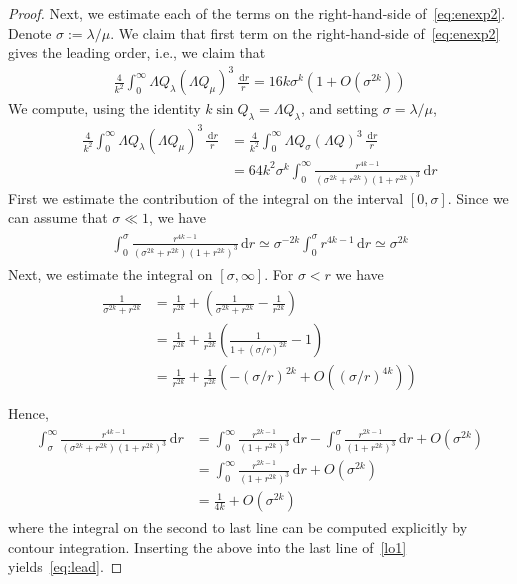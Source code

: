 \documentclass[10pt,reqno]{amsart}
\newcommand{\la}{\lambda}
\newcommand{\s}{\sigma}
\newcommand{\La}{\Lambda}
\newcommand{\I}{\infty}
\newcommand{\ant}[1]{\begin{align*}\begin{split} #1 \end{split}\end{align*}}
\newcommand{\EQ}[1]{\begin{equation}\begin{split} #1 \end{split}\end{equation}}
\numberwithin{equation}{section}
\theoremstyle{remark}
\newcommand{\dr}{\, \mathrm{d}r}
\newcommand{\0}{\emptyset}
\begin{document}
\begin{proof}
{ }
 Next, we estimate each of the terms on the right-hand-side of~\eqref{eq:enexp2}. Denote $\s := \la / \mu$. We claim that first term on the right-hand-side of~\eqref{eq:enexp2} gives the leading order, i.e., we claim that 
 \EQ{ \label{eq:lead}
  \frac{4}{k^2} \int_0^\I \La Q_\la (\La Q_\mu)^3 \, \frac{\dr}{r} = 16k \s^k( 1+ O(\s^{2k})) 
 } 
 We compute, using the identity $k \sin Q_\la =\La Q_\la$, and setting $\s = \la/ \mu$, 
 \begin{align}
  \frac{4}{k^2} \int_0^\I \La Q_\la (\La Q_\mu)^3 \, \frac{\dr}{r} &=\frac{4}{k^2} \int_0^\I \La Q_\s (\La Q)^3 \, \frac{\dr}{r}  \\
 & = 64k^2 \s^k \int_0^\I \frac{ r^{4k-1}}{( \s^{2k} + r^{2k})(1+ r^{2k})^3} \dr \label{lo1}
 \end{align}
 First we estimate the contribution of the integral on the interval $[0, \s]$. Since we can assume that $\s \ll 1$, we have 
 \ant{
 \int_0^\s \frac{ r^{4k-1}}{( \s^{2k} + r^{2k})(1+ r^{2k})^3} \dr \simeq \s^{-2k}\int_0^\s r^{4k-1} \dr   \simeq  \s^{2k}
 }
 Next, we estimate the integral on $[\s, \infty]$. For $\s <r$ we have 
 \ant{
  \frac{1}{ \s^{2k} + r^{2k}}  &= \frac{1}{r^{2k}}+  \left( \frac{1}{ \s^{2k} + r^{2k}} - \frac{1}{r^{2k}} \right) \\
  & = \frac{1}{r^{2k}} + \frac{1}{r^{2k}}\left( \frac{1}{ 1 + (\s/r)^{2k}} - 1 \right) \\
  & =  \frac{1}{r^{2k}}+ \frac{1}{r^{2k}}\left( - (\s/r)^{2k} + O( (\s/r)^{4k}) \right) \\
  }
  Hence, 
  \ant{
   \int_\s^\I \frac{ r^{4k-1}}{( \s^{2k} + r^{2k})(1+ r^{2k})^3} \dr &=  \int_0^\I  \frac{r^{2k-1}}{ (1+ r^{2k})^3} \dr -  \int_0^\s  \frac{r^{2k-1}}{ (1+ r^{2k})^3} \dr + O( \s^{2k}) \\
   & =  \int_0^\I  \frac{r^{2k-1}}{ (1+ r^{2k})^3} \dr + O( \s^{2k}) \\
   & = \frac{1}{4k} + O( \s^{2k})
      }
      where the integral on the second to  last line can be computed explicitly by contour integration. Inserting the above into the last line of~\eqref{lo1} yields~\eqref{eq:lead}.  


\end{proof}
\end{document}
